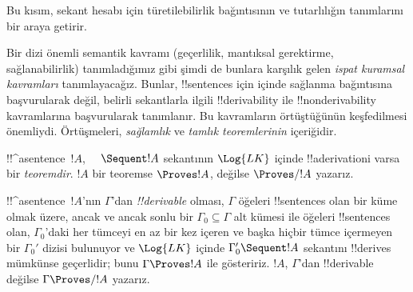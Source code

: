 

\begin{editorial}
  Bu kısım, sekant hesabı için türetilebilirlik bağıntısının ve tutarlılığın
  tanımlarını bir araya getirir.
\end{editorial}

      {}
      {}


\begin{explain}
Bir dizi önemli semantik kavramı (geçerlilik, mantıksal gerektirme,
sağlanabilirlik) tanımladığımız gibi şimdi de bunlara karşılık gelen
\emph{ispat kuramsal kavramları} tanımlayacağız. Bunlar, !!{sentence}s için
 içinde sağlanma bağıntısına başvurularak değil, belirli sekantlarla ilgili
!!{derivability} ile !!{nonderivability} kavramlarına başvurularak tanımlanır. Bu
kavramların örtüştüğünün keşfedilmesi önemliydi. Örtüşmeleri, \emph{sağlamlık}
ve \emph{tamlık teoremlerinin} içeriğidir.
\end{explain}

\begin{defn}[Teoremler]
!!^a{sentence}~$!A$, $\quad \Sequent !A$ sekantının $\Log{LK}$ içinde
!!a{derivation}{}i varsa bir \emph{teoremdir}. $!A$ bir teoremse $\Proves !A$,
değilse $\Proves/ !A$ yazarız.
\end{defn}

\begin{defn}[!!^{derivability}]
!!^a{sentence}~$!A$'nın $\Gamma$'dan \emph{!!{derivable}} olması,
$\Gamma$ öğeleri !!{sentence}s olan bir küme olmak üzere, ancak ve ancak sonlu bir
$\Gamma_0\subseteq\Gamma$ alt kümesi ile öğeleri !!{sentence}s olan,
$\Gamma_0$'daki her tümceyi en az bir kez içeren ve başka hiçbir tümce
içermeyen bir $\Gamma_0'$ dizisi bulunuyor ve $\Log{LK}$ içinde $\Gamma_0'\Sequent
!A$ sekantını !!{derive}s mümkünse geçerlidir; bunu $\Gamma\Proves !A$ ile gösteririz.
$!A$, $\Gamma$'dan !!{derivable}
değilse $\Gamma \Proves/ !A$ yazarız.
\end{defn}

